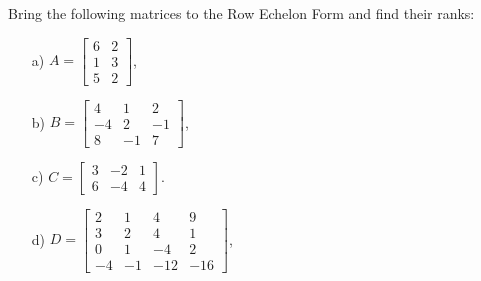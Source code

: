 \begin{problem}%
    Bring the following matrices to the Row Echelon Form and find their ranks:

    \begin{enumerate}
        \item[a) ] $A=\begin{bmatrix}6&2\\1&3\\5&2\end{bmatrix}$,
        
        \item[b) ] $B=\begin{bmatrix}4&1&2\\-4&2&-1\\8&-1&7\end{bmatrix}$,
        
        \item[c) ] $C=\begin{bmatrix}3&-2&1\\6&-4&4\end{bmatrix}$.

        \item[d) ] $D=\begin{bmatrix}2&1&4&9\\3&2&4&1\\0&1&-4&2\\-4&-1&-12&-16\end{bmatrix}$,
        
    \end{enumerate}
\end{problem}

\bigskip


